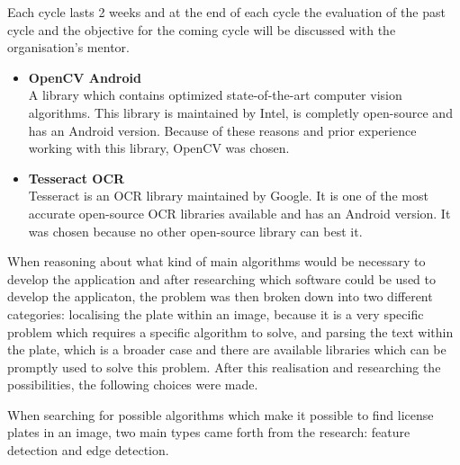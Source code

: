 Each cycle lasts 2 weeks and at the end of each cycle the evaluation of the past cycle and the objective for the coming cycle will be discussed with the organisation's mentor.


\begin{itemize}
    \item{\textbf{OpenCV Android} \\
        A library which contains optimized state-of-the-art computer vision algorithms. This library is maintained by Intel, is completly open-source and has an Android version. Because of these reasons and prior experience working with this library, OpenCV was chosen.
    }

    \item{\textbf{Tesseract OCR} \\
        Tesseract is an OCR library maintained by Google. It is one of the most accurate open-source OCR libraries available and has an Android version. It was chosen because no other open-source library can best it.
    }
\end{itemize}


When reasoning about what kind of main algorithms would be necessary to develop the application and after researching which software could be used to develop the applicaton, the problem was then broken down into two different categories: localising the plate within an image, because it is a very specific problem which requires a specific algorithm to solve, and parsing the text within the plate, which is a broader case and there are available libraries which can be promptly used to solve this problem. After this realisation and researching the possibilities, the following choices were made.


When searching for possible algorithms which make it possible to find license plates in an image, two main types came forth from the research: feature detection and edge detection. 

